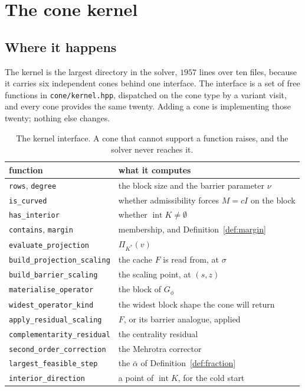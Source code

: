 \documentclass[a4paper,11pt]{book}
\theoremstyle{plain}
\theoremstyle{definition}
\theoremstyle{remark}
\numberwithin{equation}{chapter}
\numberwithin{algorithm}{chapter}
\newcommand{\proj}[2]{\Pi_{#2}\!\left(#1\right)}
\newcommand{\intr}{\operatorname{int}}
\begin{document}
	\chapter{The cone kernel}

	\section{Where it happens}

	The kernel is the largest directory in the solver, $1957$ lines over ten
	files, because it carries six independent cones behind one interface. The
	interface is a set of free functions in \texttt{cone/kernel.hpp}, dispatched
	on the cone type by a variant visit, and every cone provides the same twenty.
	Adding a cone is implementing those twenty; nothing else changes.

	\begin{table}[H]
		\centering\small
		\begin{tabular}{ll}
			\toprule
			function & what it computes\\
			\midrule
			\texttt{rows}, \texttt{degree} & the block size and the barrier
			parameter $\nu$\\
			\texttt{is\_curved} & whether admissibility forces $M=cI$ on the block\\
			\texttt{has\_interior} & whether $\intr K\neq\emptyset$\\
			\texttt{contains}, \texttt{margin} & membership, and
			Definition~\ref{def:margin}\\
			\texttt{evaluate\_projection} & $\proj{v}{K^*}$\\
			\texttt{build\_projection\_scaling} & the cache $F$ is read from, at
			$\sigma$\\
			\texttt{build\_barrier\_scaling} & the scaling point, at $(s,z)$\\
			\texttt{materialise\_operator} & the block of $G_\phi$\\
			\texttt{widest\_operator\_kind} & the widest block shape the cone will
			return\\
			\texttt{apply\_residual\_scaling} & $F$, or its barrier analogue,
			applied\\
			\texttt{complementarity\_residual} & the centrality residual\\
			\texttt{second\_order\_correction} & the Mehrotra corrector\\
			\texttt{largest\_feasible\_step} & the $\bar\alpha$ of
			Definition~\ref{def:fraction}\\
			\texttt{interior\_direction} & a point of $\intr K$, for the cold start\\
			\bottomrule
		\end{tabular}
		\caption{The kernel interface. A cone that cannot support a function raises,
			and the solver never reaches it.}
	\end{table}
\end{document}
